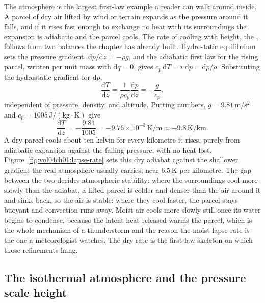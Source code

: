 The atmosphere is the largest first-law example a reader can walk around inside.
A parcel of dry air lifted by wind or terrain expands as the pressure around it
falls, and if it rises fast enough to exchange no heat with its surroundings the
expansion is adiabatic and the parcel cools. The rate of cooling with height, the
, follows from two balances the chapter has
already built. Hydrostatic equilibrium sets the pressure gradient,
$\mathrm{d}p/\mathrm{d}z = -\rho g$, and the adiabatic first law for the rising
parcel, written per unit mass with $\mathrm{d}q = 0$, gives $c_p\,\mathrm{d}T =
v\,\mathrm{d}p = \mathrm{d}p/\rho$. Substituting the hydrostatic gradient for
$\mathrm{d}p$,
\[
\frac{\mathrm{d}T}{\mathrm{d}z} = \frac{1}{\rho c_p}\frac{\mathrm{d}p}{\mathrm{d}z}
= -\frac{g}{c_p},
\]
independent of pressure, density, and altitude. Putting numbers,
$g = 9.81\,\text{m}/\text{s}^2$ and $c_p = 1005\,\text{J}/(\text{kg}\cdot
\si{\kelvin})$ give
\[
\frac{\mathrm{d}T}{\mathrm{d}z} = -\frac{9.81}{1005} =
-9.76 \times 10^{-3}\,\si{\kelvin}/\text{m} \approx -9.8\,\si{\kelvin}/\text{km}.
\]
A dry parcel cools about ten kelvin for every kilometre it rises, purely from
adiabatic expansion against the falling pressure, with no heat lost.
Figure~\ref{fig:vol04ch01:lapse-rate} sets this dry adiabat against the shallower
gradient the real atmosphere usually carries, near $6.5\,\si{\kelvin}$ per
kilometre. The gap between the two decides atmospheric stability: where the
surroundings cool more slowly than the adiabat, a lifted parcel is colder and
denser than the air around it and sinks back, so the air is stable; where they
cool faster, the parcel stays buoyant and convection runs away. Moist air cools
more slowly still once its water begins to condense, because the latent heat
released warms the parcel, which is the whole mechanism of a thunderstorm and the
reason the moist lapse rate is the one a meteorologist watches. The dry rate is
the first-law skeleton on which those refinements hang.



\subsection{The isothermal atmosphere and the pressure scale height}

